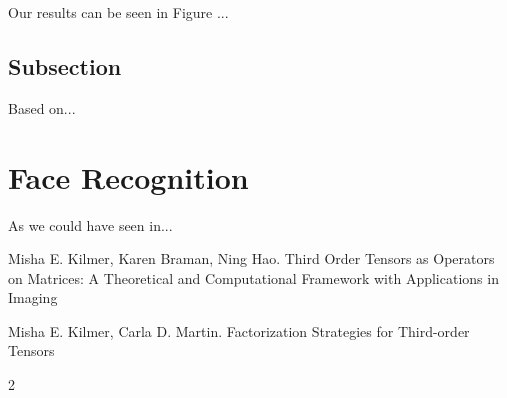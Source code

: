 \documentclass[twoside]{article}
\begin{document}
\begin{multicols}{2}
\noindent Our results can be seen in Figure ...

\subsection{Subsection}
Based on...


\section{Face Recognition}
As we could have seen in...





\begin{thebibliography}{99}

Misha E. Kilmer, Karen Braman, Ning Hao.
\newblock Third Order Tensors as Operators on Matrices: A
Theoretical and Computational Framework with
Applications in Imaging

Misha E. Kilmer, Carla D. Martin.
\newblock Factorization Strategies for Third-order Tensors

 
\end{thebibliography}


\end{multicols}{2}
\end{document}
